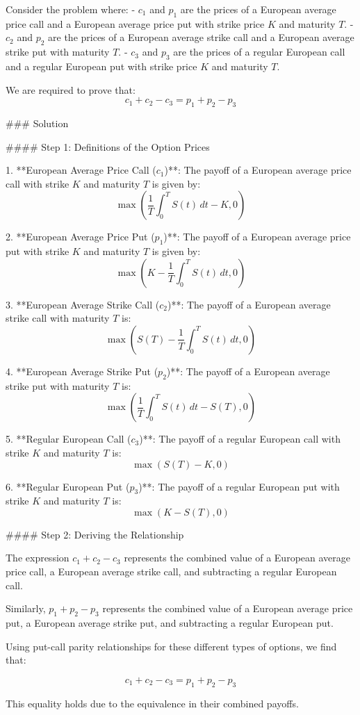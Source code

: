 \documentclass{article}
\begin{document}
Consider the problem where:
- \( c_1 \) and \( p_1 \) are the prices of a European average price call and a European average price put with strike price \( K \) and maturity \( T \).
- \( c_2 \) and \( p_2 \) are the prices of a European average strike call and a European average strike put with maturity \( T \).
- \( c_3 \) and \( p_3 \) are the prices of a regular European call and a regular European put with strike price \( K \) and maturity \( T \).

We are required to prove that:
\[
c_1 + c_2 - c_3 = p_1 + p_2 - p_3
\]

### Solution

#### Step 1: Definitions of the Option Prices

1. **European Average Price Call (\( c_1 \))**:
   The payoff of a European average price call with strike \( K \) and maturity \( T \) is given by:
   \[
   \max\left(\frac{1}{T} \int_0^T S(t) \, dt - K, 0\right)
   \]

2. **European Average Price Put (\( p_1 \))**:
   The payoff of a European average price put with strike \( K \) and maturity \( T \) is given by:
   \[
   \max\left(K - \frac{1}{T} \int_0^T S(t) \, dt, 0\right)
   \]

3. **European Average Strike Call (\( c_2 \))**:
   The payoff of a European average strike call with maturity \( T \) is:
   \[
   \max\left(S(T) - \frac{1}{T} \int_0^T S(t) \, dt, 0\right)
   \]

4. **European Average Strike Put (\( p_2 \))**:
   The payoff of a European average strike put with maturity \( T \) is:
   \[
   \max\left(\frac{1}{T} \int_0^T S(t) \, dt - S(T), 0\right)
   \]

5. **Regular European Call (\( c_3 \))**:
   The payoff of a regular European call with strike \( K \) and maturity \( T \) is:
   \[
   \max(S(T) - K, 0)
   \]

6. **Regular European Put (\( p_3 \))**:
   The payoff of a regular European put with strike \( K \) and maturity \( T \) is:
   \[
   \max(K - S(T), 0)
   \]

#### Step 2: Deriving the Relationship

The expression \( c_1 + c_2 - c_3 \) represents the combined value of a European average price call, a European average strike call, and subtracting a regular European call.

Similarly, \( p_1 + p_2 - p_3 \) represents the combined value of a European average price put, a European average strike put, and subtracting a regular European put.

Using put-call parity relationships for these different types of options, we find that:

\[
c_1 + c_2 - c_3 = p_1 + p_2 - p_3
\]

This equality holds due to the equivalence in their combined payoffs.
\end{document}
